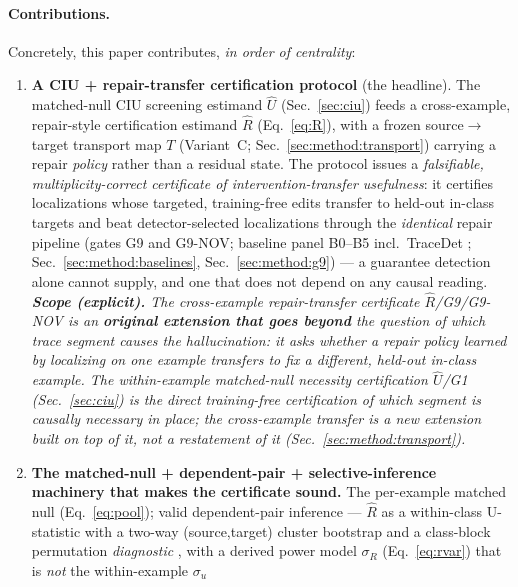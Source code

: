 \documentclass[11pt]{article}
\theoremstyle{plain}
\theoremstyle{definition}
\newcommand{\Uhat}{\widehat{U}}
\newcommand{\Rhat}{\widehat{R}}
\newcommand{\sR}{\sigma_{R}}
\newcommand{\sU}{\sigma_{u}}
\begin{document}
\paragraph{Contributions.} Concretely, this paper contributes, \emph{in order of
centrality}:
\begin{enumerate}[leftmargin=1.4em,itemsep=2pt]
  \item \textbf{A CIU + repair-transfer certification protocol} (the headline). The
  matched-null CIU screening estimand $\Uhat$ (Sec.~\ref{sec:ciu}) feeds a
  cross-example, repair-style certification estimand $\Rhat$ (Eq.~\ref{eq:R}), with a
  frozen source$\to$target transport map $T$ (Variant~C; Sec.~\ref{sec:method:transport})
  carrying a repair \emph{policy} rather than a residual state. The protocol issues a
  \emph{falsifiable, multiplicity-correct certificate of intervention-transfer
  usefulness}: it certifies localizations whose targeted, training-free edits transfer
  to held-out in-class targets and beat detector-selected localizations through the
  \emph{identical} repair pipeline (gates G9 and G9-NOV; baseline panel B0--B5 incl.\
  TraceDet \cite{tracedet2026diffusion}; Sec.~\ref{sec:method:baselines},
  Sec.~\ref{sec:method:g9}) --- a guarantee detection alone cannot supply, and one
  that does not depend on any causal reading.
  \emph{\textbf{Scope (explicit).} The cross-example repair-transfer certificate
  $\Rhat$/G9/G9-NOV is an \textbf{original extension that goes beyond} the question of
  \emph{which} trace segment causes the hallucination: it asks whether a repair
  \emph{policy} learned by localizing on one example \emph{transfers} to fix a different,
  held-out in-class example. The within-example matched-null necessity certification
  $\Uhat$/G1 (Sec.~\ref{sec:ciu}) is the direct training-free certification of which
  segment is causally necessary in place; the cross-example transfer is a new extension
  built on top of it, not a restatement of it (Sec.~\ref{sec:method:transport}).}
  \item \textbf{The matched-null + dependent-pair + selective-inference machinery
  that makes the certificate sound.} The per-example matched null
  (Eq.~\ref{eq:pool}); valid dependent-pair inference --- $\Rhat$ as a within-class
  U-statistic \cite{hoeffding1948class,lee1990ustatistics} with a two-way
  (source,target) cluster bootstrap \cite{cameron2011robust,owen2007pigeonhole} and a
  class-block permutation \emph{diagnostic} \cite{good2005permutation}, with a derived
  power model $\sR$ (Eq.~\ref{eq:rvar}) that is \emph{not} the within-example $\sU$

\end{enumerate}
\end{document}
